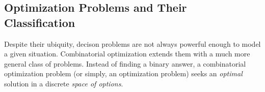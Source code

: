\subsection{Optimization Problems and Their Classification}

Despite their ubiquity, decison problems are not always powerful enough to model a given situation. Combinatorial optimization extends them with a much more general class of problems. Instead of finding a binary answer, a combinatorial optimization problem (or simply, an optimization problem) seeks an \emph{optimal} solution in a discrete \emph{space of options}.

